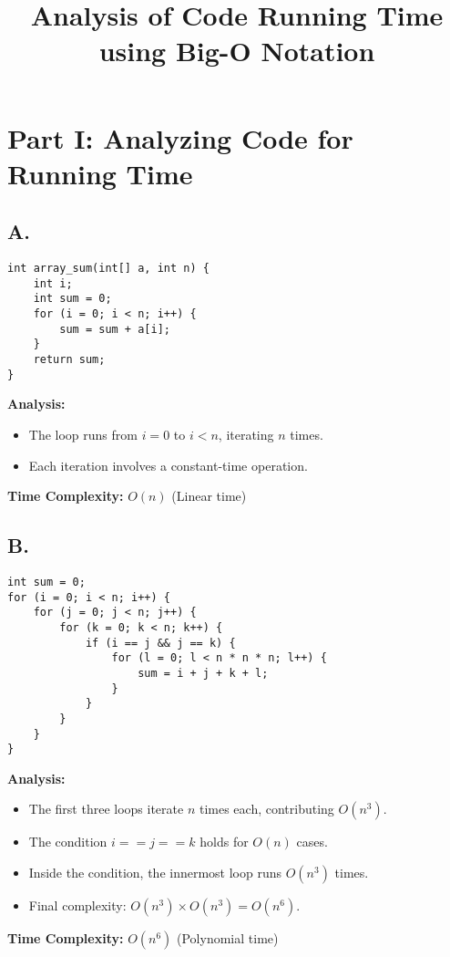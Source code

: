 \documentclass{article}
\begin{document}
\title{Analysis of Code Running Time using Big-O Notation}
\author{}
\date{}
\maketitle

\section*{Part I: Analyzing Code for Running Time}

\subsection*{A.}
\begin{lstlisting}
int array_sum(int[] a, int n) {
    int i;
    int sum = 0;
    for (i = 0; i < n; i++) {
        sum = sum + a[i];
    }
    return sum;
}
\end{lstlisting}

\textbf{Analysis:}
\begin{itemize}
  \item The loop runs from \( i = 0 \) to \( i < n \), iterating \( n \) times.
  \item Each iteration involves a constant-time operation.
\end{itemize}
\textbf{Time Complexity:} \( O(n) \) (Linear time)

\subsection*{B.}
\begin{lstlisting}
int sum = 0;
for (i = 0; i < n; i++) {
    for (j = 0; j < n; j++) {
        for (k = 0; k < n; k++) {
            if (i == j && j == k) {
                for (l = 0; l < n * n * n; l++) {
                    sum = i + j + k + l;
                }
            }
        }
    }
}
\end{lstlisting}

\textbf{Analysis:}
\begin{itemize}
  \item The first three loops iterate \( n \) times each, contributing \( O(n^3) \).
  \item The condition \( i == j == k \) holds for \( O(n) \) cases.
  \item Inside the condition, the innermost loop runs \( O(n^3) \) times.
  \item Final complexity: \( O(n^3) \times O(n^3) = O(n^6) \).
\end{itemize}
\textbf{Time Complexity:} \( O(n^6) \) (Polynomial time)
\end{document}
